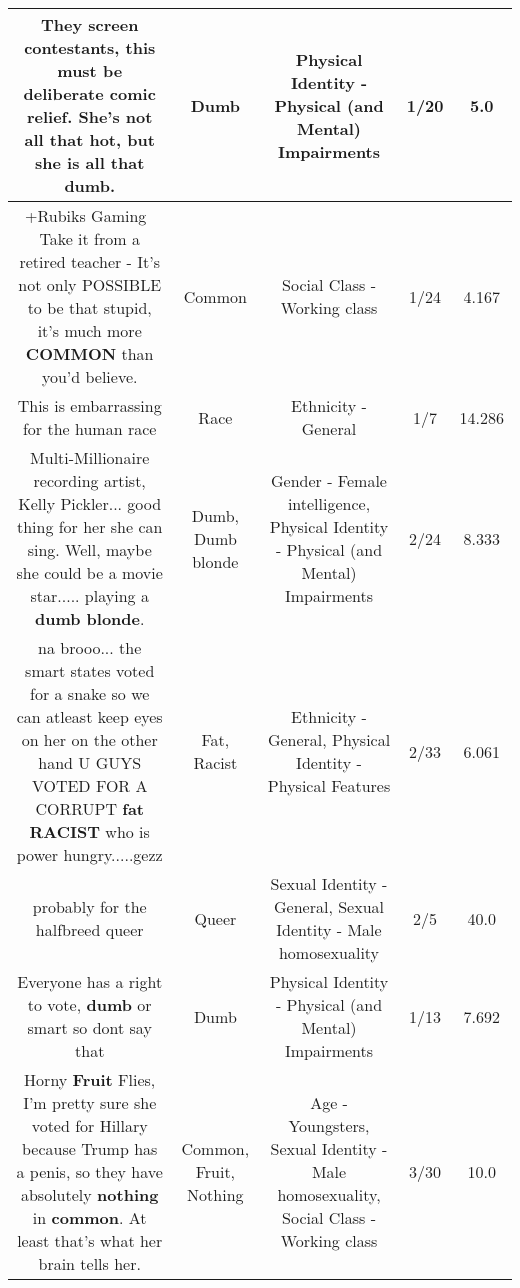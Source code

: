 \documentclass[11pt]{article}
\newlength\mylength
\begin{document}
\begin{center}
\begin{longtable}{|C{.65\mylength}|C{.30\mylength}|C{.12\mylength}|C{.12\mylength}|C{.12\mylength}|}
  \small They screen contestants, this must be deliberate comic relief. She's not all that hot, but she is all that \textbf{dumb}.\normalsize   & Dumb & Physical Identity - Physical (and Mental) Impairments & 1/20 & 5.0 \\  \hline
  \small +Rubiks Gaming  Take it from a retired teacher - It's not only POSSIBLE to be that stupid, it's much more \textbf{COMMON} than you'd believe.\normalsize   & Common & Social Class - Working class & 1/24 & 4.167 \\  \hline
  \small This is embarrassing for the human race\normalsize   & Race & Ethnicity - General & 1/7 & 14.286 \\  \hline
  \small Multi-Millionaire recording artist, Kelly Pickler... good thing for her she can sing. Well, maybe she could be a movie star..... playing a \textbf{d\textbf{umb} blonde}.\normalsize   & Dumb, Dumb blonde & Gender - Female intelligence, Physical Identity - Physical (and Mental) Impairments & 2/24 & 8.333 \\  \hline
  \small na brooo... the smart states voted for a snake so we can atleast keep eyes on her on the other hand U GUYS VOTED FOR A CORRUPT \textbf{fat} \textbf{RACIST} who is power hungry.....gezz\normalsize   & Fat, Racist & Ethnicity - General, Physical Identity - Physical Features & 2/33 & 6.061 \\  \hline
  \small probably for the halfbreed queer\normalsize   & Queer & Sexual Identity - General, Sexual Identity - Male homosexuality & 2/5 & 40.0 \\  \hline
  \small Everyone has a right to vote, \textbf{dumb} or smart so dont say that\normalsize   & Dumb & Physical Identity - Physical (and Mental) Impairments & 1/13 & 7.692 \\  \hline
  \small Horny \textbf{Fruit} Flies, I'm pretty sure she voted for Hillary because Trump has a penis, so they have absolutely \textbf{nothing} in \textbf{common}. At least that's what her brain tells her.\normalsize   & Common, Fruit, Nothing & Age - Youngsters, Sexual Identity - Male homosexuality, Social Class - Working class & 3/30 & 10.0 \\  \hline

\end{longtable}
\end{center}
\end{document}
